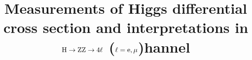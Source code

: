 \newcommand{\Zee}{\mathrm{\cPZ\rightarrow\Pe^{+}\Pe^{-}}}
\newcommand{\Zone}{\mathrm{Z}}
\newcommand{\MassD}{\mathrm{{\cal D}_{\rm mass}} }
\newcommand{\MassDprime}{\mathrm{{\cal D}'_{\rm mass}} }
\newcommand{\LikMass}{\mathcal{L}_{3D}^{m,\Gamma} }
\newcommand{\LikMassTwoD}{\mathcal{L}_{2D}^{m,\Gamma} }
\newcommand{\LikMassOneD}{\mathcal{L}_{1D}^{m,\Gamma} }
\newcommand{\LikMuOneD}{\mathrm{{\cal L}_{1D}(m_{4l})} }
\newcommand{\LikMuTwoD}{\mathrm{{\cal L}_{2D}(m_{4l},\KD)} }
\newcommand{\LikMuOneDPrime}{\mathrm{{\cal L}_{1D}(m_{4l}')} }
\newcommand{\LikMuTwoDPrime}{\mathrm{{\cal L}_{2D}(m_{4l}',\KD)} }
\newcommand{\muV}{\ensuremath{\mu_{\mathrm{VBF},\mathrm{V\PH}}} }
\newcommand{\muF}{\ensuremath{\mu_{\Pg\Pg\PH,\,\ttbar\PH}} }
\providecommand{\cmsTable}[1]{\resizebox{\textwidth}{!}{#1}}

\newcommand{\usedLumiA}{36.8\fbinv}
\newcommand{\usedLumiB}{41.4\fbinv}
\newcommand{\usedLumiC}{58.8\fbinv}
\newcommand{\usedLumiABC}{137\fbinv}
\newcommand{\posOfPValueMinimum}{12X.X}
\newcommand{\expSignAtMinimum}{xx.x}
\newcommand{\obsSignAtMinimum}{yy.y}
\newcommand{\expSignAtRunIMass}{10.5}
\newcommand{\obsSignAtRunIMass}{10.8}
\newcommand{\valMuAtRunIMass}{\ensuremath{1.11^{+0.19}_{-0.17}}}
\newcommand{\valMuVAtRunIMass}{\ensuremath{0.98}^{+0.92}_{-0.68}}
\newcommand{\valMuFAtRunIMass}{\ensuremath{1.17}^{+0.19}_{-0.18}}
\newcommand{\valMass}{\ensuremath{12X.XX^{+0.xx}_{-0.yy}}}
\newcommand{\valMassThreeDRefit}{\ensuremath{125.25 \pm 0.20 (\mathrm{stat.}) \pm 0.08 (\mathrm{sys.})}}
\newcommand{\valMuV}{\ensuremath{0.82}^{+0.36}_{-0.31}}
\newcommand{\valMuF}{\ensuremath{0.96}^{+0.14}_{-0.12}}


\newcommand{\Dbkgkin}{\ensuremath{{\mathcal{D}}^{\mathrm{kin}}_{\mathrm{bkg}}}\xspace}
\newcommand{\DbkgVBFdec}{\ensuremath{{\mathcal{D}}^{\mathrm{VBF}+\mathrm{dec}}_{\mathrm{bkg}}}\xspace}
\newcommand{\DbkgVHdec}{\ensuremath{{\mathcal{D}}^{\mathrm{VH}+\mathrm{dec}}_{\mathrm{bkg}}}\xspace}


\title{Measurements of Higgs differential cross section and interpretations in \texorpdfstring{$\mathrm{H}\rightarrow{\rm Z}{\rm Z}\rightarrow4\ell$ ($\ell={\rm e},\mu$)} channel}


